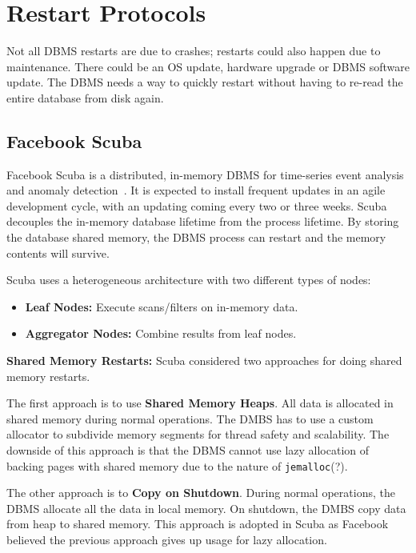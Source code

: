 \documentclass[11pt]{article}
\begin{document}
\section{Restart Protocols}
Not all DBMS restarts are due to crashes; restarts could also happen due to maintenance. There could be an OS update, hardware upgrade or DBMS software update. The DBMS needs a way to quickly restart without having to re-read the entire database from disk again.

\subsection*{Facebook Scuba}
Facebook Scuba is a distributed, in-memory DBMS for time-series event analysis and anomaly detection~\cite{Goel:2014}. It is expected to install frequent updates in an agile development cycle, with an updating coming every two or three weeks. Scuba decouples the in-memory database lifetime from the process lifetime. By storing the database shared memory, the DBMS process can restart and the memory contents will survive. 

Scuba uses a heterogeneous architecture with two different types of nodes:
\begin{itemize}
  \item \textbf{Leaf Nodes:} Execute scans/filters on in-memory data. 
  \item \textbf{Aggregator Nodes:} Combine results from leaf nodes.
\end{itemize} 

\textbf{Shared Memory Restarts:} 
Scuba considered two approaches for doing shared memory restarts. 

The first approach is to use \textbf{Shared Memory Heaps}. All data is allocated in shared memory during normal operations. The DMBS has to use a custom allocator to subdivide memory segments for thread safety and scalability. The downside of this approach is that the DBMS cannot use lazy allocation of backing pages with shared memory due to the nature of \texttt{jemalloc}(?).

The other approach is to \textbf{Copy on Shutdown}. During normal operations, the DBMS allocate all the data in local memory. On shutdown, the DMBS copy data from heap to shared memory. This approach is adopted in Scuba as Facebook believed the previous approach gives up usage for lazy allocation.
\end{document}

